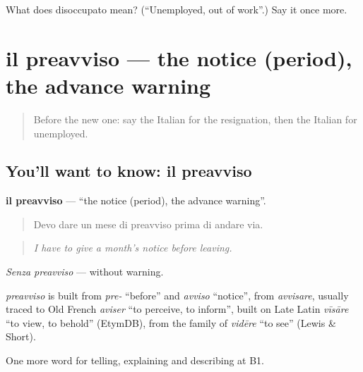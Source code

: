\begin{tcolorbox}[breakable,colback=teal!4,colframe=teal!35!black,title={Before you move on}]
What does disoccupato mean? (\textquotedblleft{}Unemployed, out of work\textquotedblright{}.) Say it once more.
\end{tcolorbox}
\section[il preavviso]{il preavviso — the notice (period), the advance warning}

\label{lesson:IT-C357-preavviso}



\begin{quote}
Before the new one: say the Italian for the resignation, then the Italian for unemployed.
\end{quote}

\subsection*{You'll want to know: il preavviso}
\textbf{il preavviso} — \textquotedblleft{}the notice (period), the advance warning\textquotedblright{}.

\begin{quote}
Devo dare un mese di preavviso prima di andare via.
\end{quote}

\begin{quote}
\emph{I have to give a month's notice before leaving.}
\end{quote}

\emph{Senza preavviso} — without warning.

\begin{cousinweb}
\emph{preavviso} is built from \emph{pre-} \textquotedblleft{}before\textquotedblright{} and \emph{avviso} \textquotedblleft{}notice\textquotedblright{}, from \emph{avvisare}, usually traced to Old French \emph{aviser} \textquotedblleft{}to perceive, to inform\textquotedblright{}, built on Late Latin \emph{vīsāre} \textquotedblleft{}to view, to behold\textquotedblright{} (EtymDB), from the family of \emph{vidēre} \textquotedblleft{}to see\textquotedblright{} (Lewis \& Short).
\end{cousinweb}

\begin{grammarlens}[title={What you've built}]
One more word for telling, explaining and describing at B1.
\end{grammarlens}

